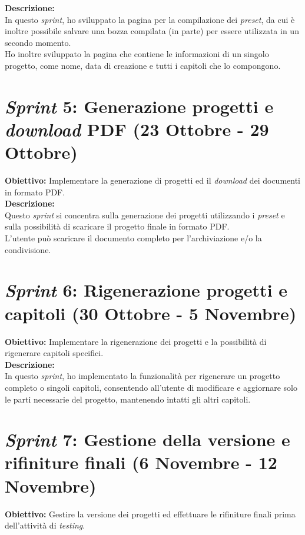 \noindent \textbf{Descrizione:}\\
\noindent In questo \textit{sprint}, ho sviluppato la pagina per la compilazione dei \textit{preset}, da cui è inoltre possibile salvare una bozza compilata (in parte) per essere utilizzata in un secondo momento.\\
Ho inoltre sviluppato la pagina che contiene le informazioni di un singolo progetto, come nome, data di creazione e tutti i capitoli che lo compongono.\\  

\section*{\textit{Sprint} 5: Generazione progetti e \textit{download} PDF (23 Ottobre - 29 Ottobre)}
\textbf{Obiettivo:} Implementare la generazione di progetti ed il \textit{download} dei documenti in formato PDF.\\

\noindent \textbf{Descrizione:}\\
\noindent Questo \textit{sprint} si concentra sulla generazione dei progetti utilizzando i \textit{preset} e sulla possibilità di scaricare il progetto finale in formato PDF.\\
L'utente può scaricare il documento completo per l'archiviazione e/o la condivisione.\\

\section*{\textit{Sprint} 6: Rigenerazione progetti e capitoli (30 Ottobre - 5 Novembre)}
\textbf{Obiettivo:} Implementare la rigenerazione dei progetti e la possibilità di rigenerare capitoli specifici.\\

\noindent \textbf{Descrizione:}\\
\noindent In questo \textit{sprint}, ho implementato la funzionalità per rigenerare un progetto completo o singoli capitoli, consentendo all'utente di modificare e aggiornare solo le parti necessarie del progetto, mantenendo intatti gli altri capitoli.\\

\section*{\textit{Sprint} 7: Gestione della versione e rifiniture finali (6 Novembre - 12 Novembre)}
\textbf{Obiettivo:} Gestire la versione dei progetti ed effettuare le rifiniture finali prima dell'attività di \textit{testing}.\\

